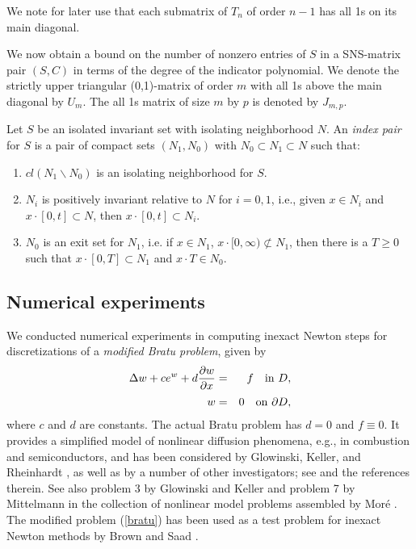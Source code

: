 \documentclass[slovensky]{svk}
\begin{document}
We note for later use that each submatrix of $T_{n}$ of
order $n-1$ has all 1s on its main diagonal. 
 
We now obtain a bound on the number of nonzero entries of
$S$ in a SNS-matrix pair $(S,C)$ in terms of the degree of
the indicator polynomial. We denote the strictly upper
triangular (0,1)-matrix of order $m$ with all 1s above the
main diagonal by $U_{m}$. The all 1s matrix of size $m$ by
$p$ is denoted by $J_{m,p}$.
 

\begin{definition}
Let $S$ be an isolated invariant set with isolating neighborhood $N$.
An {\em index pair} for $S$ is a pair of compact sets $(N_{1},N_{0})$
with $N_{0} \subset N_{1} \subset N$ such that:
\begin{enumerate}
\item $cl(N_{1} \backslash N_{0})$
is an isolating neighborhood for $S$.
\item $N_{i}$ is positively invariant relative to $N$ for $i=0,1$,
i.e., given
$x \in N_{i}$ and $x \cdot [0,t] \subset N$, then $x \cdot [0,t] \subset
N_{i}$.
\item $N_{0}$ is an exit set for $N_{1}$, i.e. if $x \in N_{1}$,
$x \cdot [0, \infty ) \not\subset N_{1}$, then there is a $T \geq 0$ such
that $x \cdot [0,T] \subset N_{1}$ and $x \cdot T \in N_{0}$.
\end{enumerate}
\end{definition}

\subsection{Numerical experiments} We conducted numerical experiments 
in computing inexact Newton steps for discretizations of a  
{\em modified Bratu problem}, given by  
\begin{eqnarray} 
{\displaystyle \Delta w + c e^w + d{ {\partial w}\over{\partial x} } } 
&=&{\displaystyle f \quad {\rm in}\ D, }\nonumber\\[-1.5ex]
\label{bratu} \\[-1.5ex]
{\displaystyle w }&=&{\displaystyle 0 \quad {\rm on}\ \partial D , } \nonumber
\end{eqnarray} 
where $c$ and $d$ are constants. The actual Bratu problem has $d=0$ and  
$f \equiv0$. It provides a simplified model of nonlinear diffusion  
phenomena, e.g., in combustion and semiconductors, and has been 
considered by Glowinski, Keller, and Rheinhardt \cite{GloKR85}, 
as well as by a number of other investigators; see \cite{GloKR85} 
and the references therein. See also problem 3 by Glowinski and  Keller  
and problem 7 by Mittelmann in the collection of nonlinear model 
problems assembled by Mor\'e \cite{More}. The modified problem  
(\ref{bratu}) has been used as a test problem for inexact Newton 
methods by Brown and Saad \cite{Brown-Saad1}.  
\end{document}
